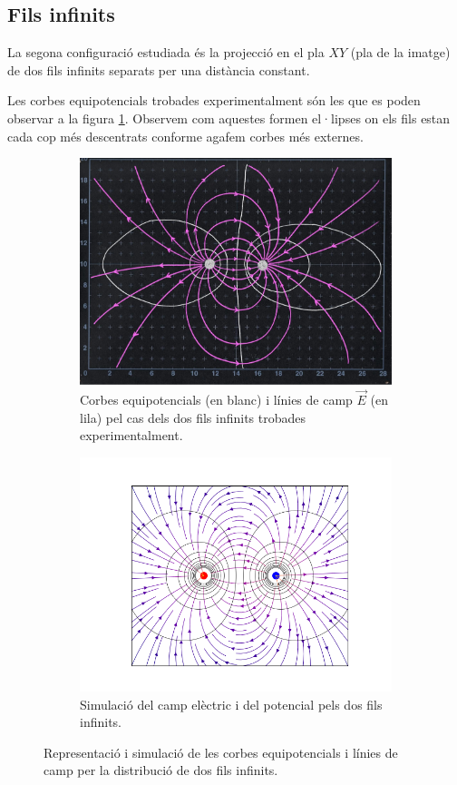 \documentclass[a4paper,10.5pt]{report}
\begin{document}
\subsection{Fils infinits}
La segona configuració estudiada és la projecció en el pla $XY$ (pla de la imatge) de dos fils infinits separats per una distància constant. 

Les corbes equipotencials trobades experimentalment són les que es poden observar a la figura \ref{fig:1.3a}. Observem com aquestes formen el·lipses on els fils estan cada cop més descentrats conforme agafem corbes més externes. 
\begin{figure}[h]
	\centering
	\begin{subfigure}{0.45\linewidth}
		\centering
		\includegraphics[width=\linewidth]{screenshot004}
		\caption{Corbes equipotencials (en blanc) i línies de camp $\vec{E}$ (en lila) pel cas dels dos fils infinits trobades experimentalment.}
		\label{fig:1.3a}
	\end{subfigure}
	\hfill
	\begin{subfigure}{0.5\linewidth}
		\centering
		\includegraphics[width=\linewidth]{figfils}
		\caption{Simulació del camp elèctric i del potencial pels dos fils infinits.}
		\label{fig:1.3b}
	\end{subfigure}
	\caption{Representació i simulació de les corbes equipotencials i línies de camp per la distribució de dos fils infinits.}
	\label{fig:1.3}
\end{figure}
\end{document}
